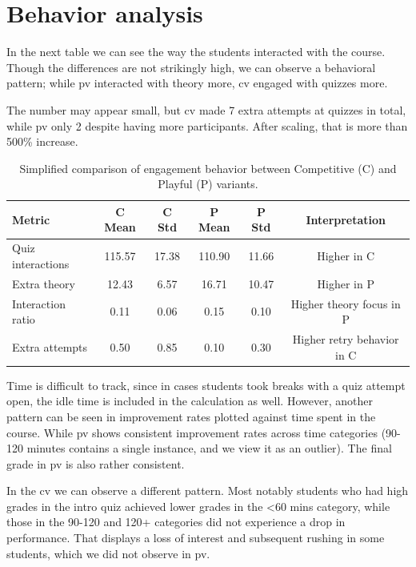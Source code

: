 \section{Behavior analysis}

In the next table we can see the way the students interacted with the course. Though the differences are not strikingly high, we can observe a behavioral pattern; while \ac{pv} interacted with theory more, \ac{cv} engaged with quizzes more. 

The number may appear small, but \ac{cv} made 7 extra attempts at quizzes in total, while \ac{pv} only 2 despite having more participants. After scaling, that is more than 500\% increase.

\FloatBarrier
\begin{table}[h]
\centering
\renewcommand{\arraystretch}{1.2}
\begin{tabular}{l c c c c c}
\hline
\textbf{Metric} & \textbf{C Mean} & \textbf{C Std} & \textbf{P Mean} & \textbf{P Std} & \textbf{Interpretation} \\
\hline
Quiz interactions & 115.57 & 17.38 & 110.90 & 11.66 & Higher in C \\
Extra theory      & 12.43  & 6.57  & 16.71  & 10.47 & Higher in P \\
Interaction ratio & 0.11   & 0.06  & 0.15   & 0.10  & Higher theory focus in P \\
Extra attempts    & 0.50   & 0.85  & 0.10   & 0.30  & Higher retry behavior in C \\
\hline
\end{tabular}
\caption{Simplified comparison of engagement behavior between Competitive (C) and Playful (P) variants.}
\label{tab:engagement_simple}
\end{table}
\FloatBarrier


Time is difficult to track, since in cases students took breaks with a quiz attempt open, the idle time is included in the calculation as well. However, another pattern can be seen in improvement rates plotted against time spent in the course. While \ac{pv} shows consistent improvement rates across time categories (90-120 minutes contains a single instance, and we view it as an outlier). The final grade in \ac{pv} is also rather consistent.

In the \ac{cv} we can observe a different pattern. Most notably students who had high grades in the intro quiz achieved lower grades in the <60 mins category, while those in the 90-120 and 120+ categories did not experience a drop in performance. That displays a loss of interest and subsequent rushing in some students, which we did not observe in \ac{pv}.

